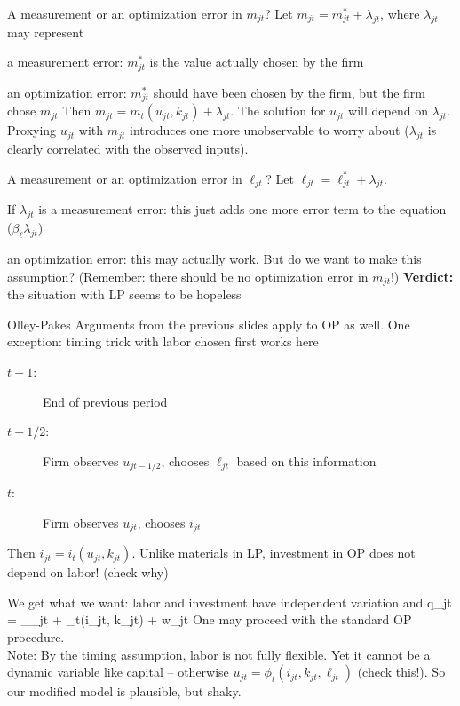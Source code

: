 \begin{frame}{A measurement or an optimization error in $m_{jt}$?}
	Let $m_{jt} = m^*_{jt} + \lambda_{jt}$, where $\lambda_{jt}$ may represent
	\bi
		\item{a measurement error: $m^*_{jt}$ is the value actually chosen by the firm}
		\item{an optimization error: $m^*_{jt}$ should have been chosen by the firm, but the firm chose $m_{jt}$}
	\ei
	Then $m_{jt} = m_t(u_{jt}, k_{jt}) + \lambda_{jt}$. The solution for $u_{jt}$ will depend on $\lambda_{jt}$. Proxying $u_{jt}$ with $m_{jt}$ introduces one more unobservable to worry about ($\lambda_{jt}$ is clearly correlated with the observed inputs).
\end{frame}

\begin{frame}{A measurement or an optimization error in $\ell_{jt}$?}
	Let $\ell_{jt} = \ell^*_{jt} + \lambda_{jt}$.
	\bi
		\item{If $\lambda_{jt}$ is a measurement error: this just adds one more error term to the equation ($\beta_\ell\lambda_{jt}$)}
		\item{an optimization error: this may actually work. But do we want to make this assumption? (Remember: there should be no optimization error in $m_{jt}$!)}
	\ei
	\textbf{Verdict:} the situation with LP seems to be hopeless
\end{frame}

\begin{frame}{Olley-Pakes}
	Arguments from the previous slides apply to OP as well. One exception: timing trick with labor chosen first works here
	\begin{description}
		\item[$t-1$:]{End of previous period}
		\item[$t-1/2:$]{Firm observes $u_{jt-1/2}$, chooses $\ell_{jt}$ based on this information}
		\item[$t$:]{Firm observes $u_{jt}$, chooses $i_{jt}$}
	\end{description}
	Then $i_{jt} = i_t(u_{jt}, k_{jt})$. Unlike materials in LP, investment in OP does not depend on labor! (check why)\\\bigskip

	We get what we want: labor and investment have independent variation and
	\be
			q_{jt} = \beta_\ell\ell_{jt} + \phi_t(i_{jt}, k_{jt}) + w_{jt}
	\ee
	One may proceed with the standard OP procedure.\\\bigskip
	Note: By the timing assumption, labor is not fully flexible. Yet it cannot be a dynamic variable like capital -- otherwise $u_{jt} = \phi_t(i_{jt}, k_{jt}, \ell_{jt})$ (check this!). So our modified model is plausible, but shaky.
\end{frame}

